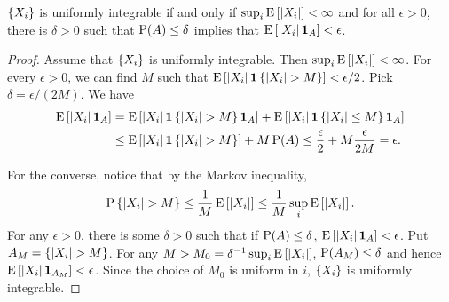 \begin{theorem}\label{thm:unif_int_characterization}
    $\set{X_i}$ is uniformly integrable if and only if $\sup_{i}\E\sbrc{\abs{X_i}}<\infty$ and 
    for all $\epsilon>0$, there is $\delta>0$ such that $\P(A)\leq \delta$ implies that 
    $\E\sbrc{\abs{X_i}\one_A}<\epsilon$. 
\end{theorem}
\begin{proof}
    Assume that $\set{X_i}$ is uniformly integrable. Then $\sup_{i}\E\sbrc{\abs{X_i}}<\infty$. 
    For every $\epsilon>0$, we can find $M$ such that $\E\sbrc{\abs{X_i}\one\set{\abs{X_i}>M}}<\epsilon/2$. 
    Pick $\delta = \epsilon/(2M)$. We have 
    \begin{equation*}
        \begin{split}
            \E\sbrc{\abs{X_i}\one_A} &= \E\sbrc{\abs{X_i}\one\set{\abs{X_i}>M}\one_A} + \E\sbrc{\abs{X_i}\one\set{\abs{X_i}\leq M}\one_A} \\
            &\leq \E\sbrc{\abs{X_i}\one\set{\abs{X_i}>M}} + M\P(A) \leq \frac{\epsilon}{2} + M\frac{\epsilon}{2M} = \epsilon. 
        \end{split}
    \end{equation*}
    
    For the converse, notice that by the Markov inequality,
    \begin{equation*}
        \P\set{\abs{X_i}>M}\leq \frac{1}{M}\E\sbrc{\abs{X_i}} \leq\frac{1}{M}\sup_i\E\sbrc{\abs{X_i}}.
    \end{equation*} 
    For any $\epsilon>0$, there is some $\delta>0$ such that if $\P(A)\leq \delta$, 
    $\E\sbrc{\abs{X_i}\one_A}<\epsilon$. Put $A_M = \set{\abs{X_i}>M}$. For any 
    $M > M_0 = \delta^{-1}\sup_i\E\sbrc{\abs{X_i}}$, $\P(A_M)\leq \delta$ and hence 
    $\E\sbrc{\abs{X_i}\one_{A_M}}<\epsilon$. Since the choice of $M_0$ is uniform in $i$, 
    $\set{X_i}$ is uniformly integrable.  
\end{proof}

